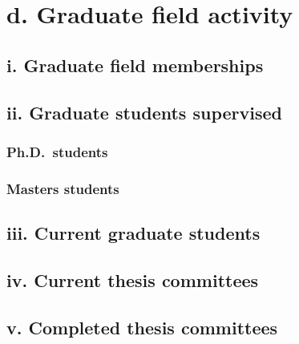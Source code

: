 \documentclass{article}
\begin{document}
%
%

\section*{d. Graduate field activity}

\subsection*{i. Graduate field memberships}



\subsection*{ii. Graduate students supervised}

\subsubsection*{Ph.D.~students}



\subsubsection*{Masters students}



\subsection*{iii. Current graduate students}



\subsection*{iv. Current thesis committees}



\subsection*{v. Completed thesis committees}
\end{document}
